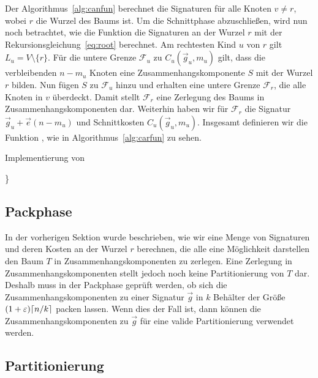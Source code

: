 Der Algorithmus~\ref{alg:canfun} berechnet die Signaturen für alle Knoten $v \neq r$, wobei $r$ die Wurzel des Baums ist.
Um die Schnittphase abzuschließen, wird nun noch betrachtet, wie die Funktion \carfun{} die Signaturen an der Wurzel $r$ mit der Rekursionsgleichung~\eqref{eq:root} berechnet.
Am rechtesten Kind $u$ von $r$ gilt $L_u = V \setminus \{r\}$.
Für die untere Grenze $\mathcal{F}_u$ zu $C_u(\vec{g}_u, m_u)$ gilt, dass die verbleibenden $n - m_u$ Knoten eine Zusammenhangskomponente $S$ mit der Wurzel $r$ bilden.
Nun fügen $S$ zu $\mathcal{F}_u$ hinzu und erhalten eine untere Grenze $\mathcal{F}_r$, die alle Knoten in $v$ überdeckt.
Damit stellt $\mathcal{F}_r$ eine Zerlegung des Baums in Zusammenhangskomponenten dar.
Weiterhin haben wir für $\mathcal{F}_r$ die Signatur $\vec{g}_u + \vec{e}(n - m_u)$ und Schnittkosten $C_u(\vec{g}_u, m_u)$.
Insgesamt definieren wir die Funktion \carfun{}, wie in Algorithmus~\ref{alg:carfun} zu sehen.

\begin{algorithm}
    \caption{Implementierung von \carfun{}}\label{alg:carfun}
    \begin{algorithmic}
                    \}
                \EndFor
           \EndFor
        \EndFunction
    \end{algorithmic}
\end{algorithm}

\subsection{Packphase}
In der vorherigen Sektion wurde beschrieben, wie wir eine Menge von Signaturen und deren Kosten an der Wurzel $r$ berechnen, die alle eine Möglichkeit darstellen den Baum $T$ in Zusammenhangskomponenten zu zerlegen.
Eine Zerlegung in Zusammenhangskomponenten stellt jedoch noch keine Partitionierung von $T$ dar.
Deshalb muss in der Packphase geprüft werden, ob sich die Zusammenhangskomponenten zu einer Signatur $\vec{g}$ in $k$ Behälter der Größe $(1+\varepsilon)\lceil n/k\rceil$ packen lassen.
Wenn dies der Fall ist, dann können die Zusammenhangskomponenten zu $\vec{g}$ für eine valide Partitionierung verwendet werden.

\subsection{Partitionierung}


